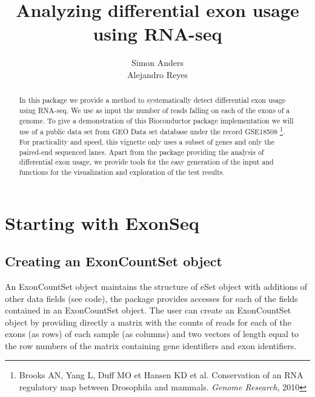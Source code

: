 \documentclass{article}
\title{\textsf{\textbf{Analyzing differential exon usage using RNA-seq}}}
\author{Simon Anders \\ Alejandro Reyes}
\begin{document}
\maketitle
\begin{abstract}
In this package we provide a method to systematically detect differential exon usage using RNA-seq. We use as input the number of reads falling on each of the exons of a genome. To give a demonstration of this Bioconductor package implementation we will use of a public data set from GEO Data set database under the record GSE18508 \footnote{Brooks AN, Yang L, Duff MO et Hansen KD et al. Conservation of an RNA regulatory map between Drosophila and mammals. \textit{Genome Research}, 2010}. For practicality and speed, this vignette only uses a subset of genes and only the paired-end sequenced lanes. Apart from the package providing the analysis of differential exon usage, we provide tools for the easy generation of the input and functions for the visualization and exploration of the test results.
\end{abstract}
\section{Starting with ExonSeq}
\subsection{Creating an ExonCountSet object}
An ExonCountSet object maintains the structure of eSet object with additions of other data fields (see code), the package provides accesses for each of the fields contained in an ExonCountSet object. The user can create an ExonCountSet object by providing directly a matrix with the counts of reads for each of the exons (as rows) of each sample (as columns) and two vectors of length equal to the row numbers of the matrix containing gene identifiers and exon identifiers.
\end{document}
